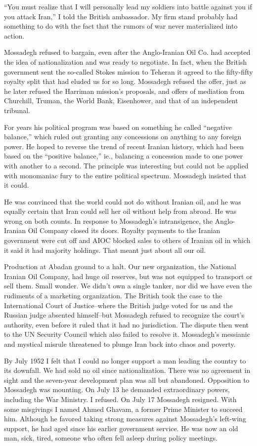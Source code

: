 “You must realize that I will personally lead my soldiers into battle against you if you attack Iran,” I told the British ambassador. My firm stand probably had something to do with the fact that the rumors of war never materialized into action. 

Mossadegh refused to bargain, even after the Anglo-Iranian Oil Co. had accepted the idea of nationalization and was ready to negotiate. In fact, when the British government sent the so-called Stokes mission to Teheran it agreed to the fifty-fifty royalty split that had eluded us for so long. Mossadegh refused the offer, just as he later refused the Harriman mission's proposals, and offers of mediation from Churchill, Truman, the World Bank, Eisenhower, and that of an independent tribunal. 

For years his political program was based on something he called “negative balance,” which ruled out granting any concessions on anything to any foreign power. He hoped to reverse the trend of recent Iranian history, which had been based on the “positive balance,” ie., balancing a concession made to one power with another to a second. The principle was interesting but could not be applied with monomaniac fury to the entire political spectrum. Mossadegh insisted that it could. 

He was convinced that the world could not do without Iranian oil, and he was equally certain that Iran could sell her oil without help from abroad. He was wrong on both counts. In response to Mossadegh’s intransigence, the Anglo-Iranian Oil Company closed its doors. Royalty payments to the Iranian government were cut off and AIOC blocked sales to others of Iranian oil in which it said it had majority holdings. That meant just about all our oil. 

Production at Abadan ground to a halt. Our new organization, the National Iranian Oil Company, had huge oil reserves, but was not equipped to transport or sell them. Small wonder. We didn’t own a single tanker, nor did we have even the rudiments of a marketing organization. The British took the case to the International Court of Justice--where the British judge voted for us and the Russian judge absented himself--but Mossadegh refused to recognize the court's authority, even before it ruled that it had no jurisdiction. The dispute then went to the UN Security Council which also failed to resolve it. Mossadegh's messianic and mystical misrule threatened to plunge Iran back into chaos and poverty. 

By July 1952 I felt that I could no longer support a man leading the country to its downfall. We had sold no oil since nationalization. There was no agreement in sight and the seven-year development plan was all but abandoned. Opposition to Mossadegh was mounting. On July 13 he demanded extraordinary powers, including the War Ministry. I refused. On July 17 Mossadegh resigned. With some misgivings I named Ahmed Ghavam, a former Prime Minister to succeed him. Although he favored taking strong measures against Mossadegh’s left-wing support, he had aged since his earlier government service. He was now an old man, sick, tired, someone who often fell asleep during policy meetings. 

